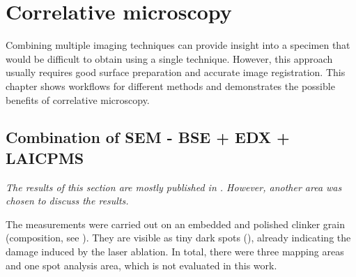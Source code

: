 \chapter{Correlative microscopy}

Combining multiple imaging techniques can provide insight into a specimen that would be difficult to obtain using a single technique.
However, this approach usually requires good surface preparation and accurate image registration.
This chapter shows workflows for different methods and demonstrates the possible benefits of correlative microscopy.







\section{Combination of \acs*{SEM} - \acs*{BSE} + \acs*{EDX} + \acs*{LAICPMS} }
\label{sec:corr_laicpms}

\textit{The results of this section are mostly published in \textcite{kleiner.2022b}. However, another area was chosen to discuss the results.}

The measurements were carried out on an embedded and polished clinker grain (composition, see ).
They are visible as tiny dark spots (), already indicating the damage induced by the laser ablation.
In total, there were three mapping areas and one spot analysis area, which is not evaluated in this work.



